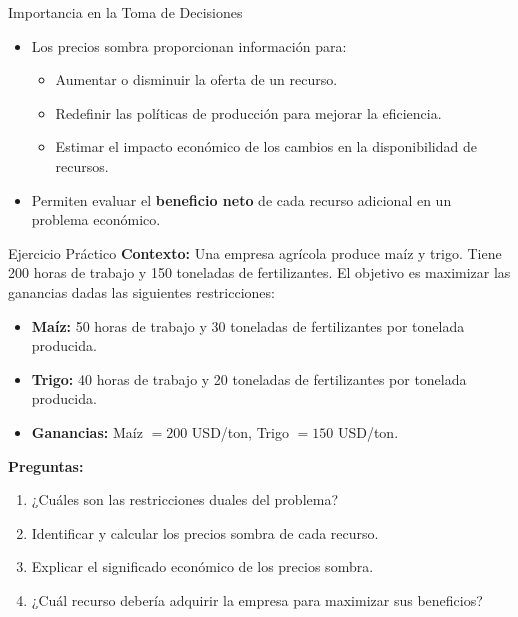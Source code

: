 \documentclass{beamer}
\begin{document}
\begin{frame}{Importancia en la Toma de Decisiones}
    \begin{itemize}
        \item Los precios sombra proporcionan información para:
        \begin{itemize}
            \item Aumentar o disminuir la oferta de un recurso.
            \item Redefinir las políticas de producción para mejorar la eficiencia.
            \item Estimar el impacto económico de los cambios en la disponibilidad de recursos.
        \end{itemize}
        \pause
        \item Permiten evaluar el \textbf{beneficio neto} de cada recurso adicional en un problema económico.
    \end{itemize}
\end{frame}

\begin{frame}{Ejercicio Práctico}
    \textbf{Contexto:} Una empresa agrícola produce maíz y trigo. Tiene 200 horas de trabajo y 150 toneladas de fertilizantes. El objetivo es maximizar las ganancias dadas las siguientes restricciones:
    \begin{itemize}
        \item \textbf{Maíz:} 50 horas de trabajo y 30 toneladas de fertilizantes por tonelada producida.
        \item \textbf{Trigo:} 40 horas de trabajo y 20 toneladas de fertilizantes por tonelada producida.
        \item \textbf{Ganancias:} Maíz $= 200$ USD/ton, Trigo $= 150$ USD/ton.
    \end{itemize}
    \textbf{Preguntas:}
    \begin{enumerate}
        \item ¿Cuáles son las restricciones duales del problema?
        \item Identificar y calcular los precios sombra de cada recurso.
        \item Explicar el significado económico de los precios sombra.
        \item ¿Cuál recurso debería adquirir la empresa para maximizar sus beneficios?
    \end{enumerate}
\end{frame}
\end{document}
